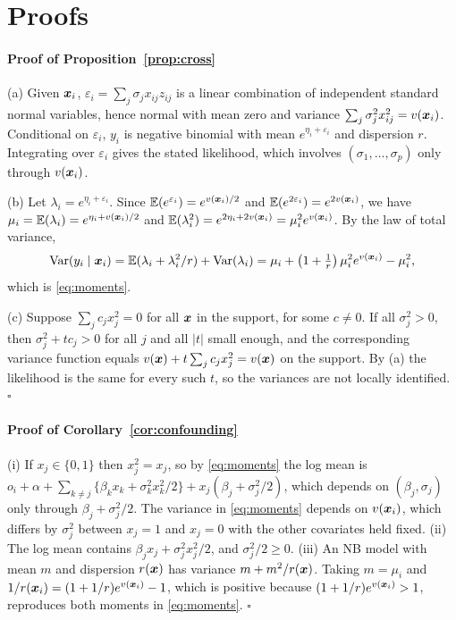 \section{Proofs}\label{app:proofs}

\paragraph{Proof of Proposition~\ref{prop:cross}}
(a) Given $\bm{x}_i$, $\varepsilon_i=\sum_j\sigma_jx_{ij}z_{ij}$ is a linear combination of independent standard normal variables, hence normal with mean zero and variance $\sum_j\sigma_j^2x_{ij}^2=v(\bm{x}_i)$. Conditional on $\varepsilon_i$, $y_i$ is negative binomial with mean $e^{\eta_i+\varepsilon_i}$ and dispersion $r$. Integrating over $\varepsilon_i$ gives the stated likelihood, which involves $(\sigma_1,\dots,\sigma_p)$ only through $v(\bm{x}_i)$.

(b) Let $\lambda_i=e^{\eta_i+\varepsilon_i}$. Since $\mathbb{E}(e^{\varepsilon_i})=e^{v(\bm{x}_i)/2}$ and $\mathbb{E}(e^{2\varepsilon_i})=e^{2v(\bm{x}_i)}$, we have $\mu_i=\mathbb{E}(\lambda_i)=e^{\eta_i+v(\bm{x}_i)/2}$ and $\mathbb{E}(\lambda_i^2)=e^{2\eta_i+2v(\bm{x}_i)}=\mu_i^2e^{v(\bm{x}_i)}$. By the law of total variance,
\[
\operatorname{Var}(y_i\mid\bm{x}_i)=\mathbb{E}(\lambda_i+\lambda_i^2/r)+\operatorname{Var}(\lambda_i)
=\mu_i+\left(1+\tfrac1r\right)\mu_i^2e^{v(\bm{x}_i)}-\mu_i^2 ,
\]
which is \eqref{eq:moments}.

(c) Suppose $\sum_jc_jx_j^2=0$ for all $\bm{x}$ in the support, for some $c\neq0$. If all $\sigma_j^2>0$, then $\sigma_j^2+tc_j>0$ for all $j$ and all $|t|$ small enough, and the corresponding variance function equals $v(\bm{x})+t\sum_jc_jx_j^2=v(\bm{x})$ on the support. By (a) the likelihood is the same for every such $t$, so the variances are not locally identified. \hfill$\square$

\paragraph{Proof of Corollary~\ref{cor:confounding}}
(i) If $x_j\in\{0,1\}$ then $x_j^2=x_j$, so by \eqref{eq:moments} the log mean is $o_i+\alpha+\sum_{k\neq j}\{\beta_kx_k+\sigma_k^2x_k^2/2\}+x_j(\beta_j+\sigma_j^2/2)$, which depends on $(\beta_j,\sigma_j)$ only through $\beta_j+\sigma_j^2/2$. The variance in \eqref{eq:moments} depends on $v(\bm{x}_i)$, which differs by $\sigma_j^2$ between $x_j=1$ and $x_j=0$ with the other covariates held fixed.
(ii) The log mean contains $\beta_jx_j+\sigma_j^2x_j^2/2$, and $\sigma_j^2/2\ge0$.
(iii) An NB model with mean $m$ and dispersion $r(\bm{x})$ has variance $m+m^2/r(\bm{x})$. Taking $m=\mu_i$ and $1/r(\bm{x}_i)=(1+1/r)e^{v(\bm{x}_i)}-1$, which is positive because $(1+1/r)e^{v(\bm{x}_i)}>1$, reproduces both moments in \eqref{eq:moments}. \hfill$\square$

